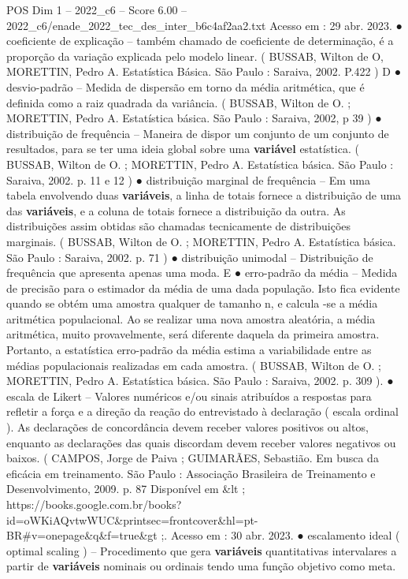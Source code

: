 \begin{textsample}{POS Dim 1 – 2022\_c6 – Score 6.00 – 2022\_c6/enade\_2022\_tec\_des\_inter\_b6c4af2aa2.txt}
Acesso em : 29 abr. 2023. {\EmojiFont ●} coeficiente de explicação – também chamado de coeficiente de determinação, é a proporção da variação explicada pelo modelo linear. ( BUSSAB, Wilton de O, MORETTIN, Pedro A.
Estatística Básica.
São Paulo : Saraiva, 2002.
P.422 ) D {\EmojiFont ●} desvio-padrão – Medida de dispersão em torno da média aritmética, que é definida como a raiz quadrada da variância. ( BUSSAB, Wilton de O. ; MORETTIN, Pedro A.
Estatística básica.
São Paulo : Saraiva, 2002, p 39 ) {\EmojiFont ●} distribuição de frequência – Maneira de dispor um conjunto de um conjunto de resultados, para se ter uma ideia global sobre uma \textbf{variável} estatística. ( BUSSAB, Wilton de O. ; MORETTIN, Pedro A.
Estatística básica.
São Paulo : Saraiva, 2002. p. 11 e 12 ) {\EmojiFont ●} distribuição marginal de frequência – Em uma tabela envolvendo duas \textbf{variáveis}, a linha de totais fornece a distribuição de uma das \textbf{variáveis}, e a coluna de totais fornece a distribuição da outra.
As distribuições assim obtidas são chamadas tecnicamente de distribuições marginais. ( BUSSAB, Wilton de O. ; MORETTIN, Pedro A.
Estatística básica.
São Paulo : Saraiva, 2002. p. 71 ) {\EmojiFont ●} distribuição unimodal – Distribuição de frequência que apresenta apenas uma moda.
E {\EmojiFont ●} erro-padrão da média – Medida de precisão para o estimador da média de uma dada população.
Isto fica evidente quando se obtém uma amostra qualquer de tamanho n, e calcula -se a média aritmética populacional.
Ao se realizar uma nova amostra aleatória, a média aritmética, muito provavelmente, será diferente daquela da primeira amostra.
Portanto, a estatística erro-padrão da média estima a variabilidade entre as médias populacionais realizadas em cada amostra. ( BUSSAB, Wilton de O. ; MORETTIN, Pedro A.
Estatística básica.
São Paulo : Saraiva, 2002. p. 309 ). {\EmojiFont ●} escala de Likert – Valores numéricos e/ou sinais atribuídos a respostas para refletir a força e a direção da reação do entrevistado à declaração ( escala ordinal ).
As declarações de concordância devem receber valores positivos ou altos, enquanto as declarações das quais discordam devem receber valores negativos ou baixos. ( CAMPOS, Jorge de Paiva ; GUIMARÃES, Sebastião.
Em busca da eficácia em treinamento.
São Paulo : Associação Brasileira de Treinamento e Desenvolvimento, 2009. p. 87 Disponível em \&lt ; https://books.google.com.br/books? id=oWKiAQvtwWUC\&printsec=frontcover\&hl=pt-BR\#v=onepage\&q\&f=true\&gt ;.
Acesso em : 30 abr. 2023. {\EmojiFont ●} escalamento ideal ( optimal scaling ) – Procedimento que gera \textbf{variáveis} quantitativas intervalares a partir de \textbf{variáveis} nominais ou ordinais tendo uma função objetivo como meta.

\end{textsample}
